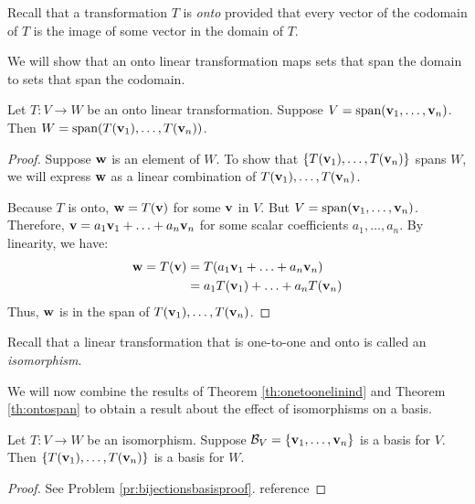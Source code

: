 \documentclass{ximera}
\renewcommand{\vec}[1]{{\bf #1}}
\newcommand{\dfn}{\textit}
\begin{document}
Recall that a transformation $T$ is \dfn{onto} provided that every vector of the codomain of $T$ is the image of some vector in the domain of $T$.  

We will show that an onto linear transformation maps sets that span the domain to sets that span the codomain. 

\begin{theorem}\label{th:ontospan}
Let $T:V\rightarrow W$ be an onto linear transformation.  Suppose $V=\text{span}(\vec{v}_1,\ldots ,\vec{v}_n)$.  Then $W=\text{span}(T(\vec{v}_1),\ldots ,T(\vec{v}_n))$.
\end{theorem}
\begin{proof}
Suppose $\vec{w}$ is an element of $W$. To show that $\{T(\vec{v}_1),\ldots ,T(\vec{v}_n)\}$ spans $W$, we will express $\vec{w}$ as a linear combination of $T(\vec{v}_1),\ldots ,T(\vec{v}_n)$.

Because $T$ is onto, $\vec{w}=T(\vec{v})$ for some $\vec{v}$ in $V$.  But $V=\text{span}(\vec{v}_1,\ldots ,\vec{v}_n)$.  Therefore, $\vec{v}=a_1\vec{v}_1+\ldots +a_n\vec{v}_n$ for some scalar coefficients $a_1,\ldots ,a_n$.
By linearity, we have:
\begin{align*}
\vec{w}=T(\vec{v})&=T(a_1\vec{v}_1+\ldots +a_n\vec{v}_n)\\
&=a_1T(\vec{v}_1)+\ldots +a_nT(\vec{v}_n)
\end{align*}
Thus, $\vec{w}$ is in the span of $T(\vec{v}_1),\ldots ,T(\vec{v}_n)$.
\end{proof}
 
Recall that a linear transformation that is one-to-one and onto is called an \dfn{isomorphism}.

We will now combine the results of Theorem \ref{th:onetoonelinind} and Theorem \ref{th:ontospan} to obtain a result about the effect of isomorphisms on a basis.

\begin{theorem}\label{th:bijectionsbasis}
Let $T:V\rightarrow W$ be an isomorphism.  Suppose $\mathcal{B}_V=\{\vec{v}_1,\ldots ,\vec{v}_n\}$ is a basis for $V$.  Then $\{T(\vec{v}_1),\ldots ,T(\vec{v}_n)\}$ is a basis for $W$.
\end{theorem}
\begin{proof}
See Problem \ref{pr:bijectionsbasisproof}. {\color{red} reference}
\end{proof}
 
 
\end{document}
